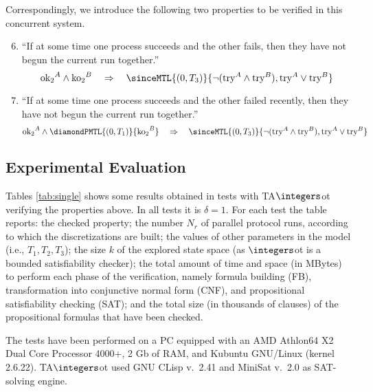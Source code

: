 \documentclass[a4paper]{article}
\newcommand{\tait}[1]{\mathrm{#1}}
\newcommand{\try}{\tait{try}}
\newcommand{\okk}{\tait{ok_2}}
\newcommand{\koo}{\tait{ko_2}}
\newcommand{\zot}{$\integers$ot}
\newcommand{\tazot}{\textsf{TA}$\integers$ot}
\theoremstyle{plain}
\theoremstyle{definition}
\begin{document}
Correspondingly, we introduce the following two properties to be verified in this concurrent system.
\begin{enumerate}
\setcounter{enumi}{5}
\item \label{pc1}
  ``If at some time one process succeeds and the other fails, then they have not begun the current run together.''
\begin{equation*}
 \okk^A \wedge \koo^B \quad\Rightarrow\quad  \sinceMTL{(0,T_3)}{\neg(\try^A \wedge \try^B),\try^A \vee \try^B}
\end{equation*}


\item \label{pc2}
  ``If at some time one process succeeds and the other failed recently, then they have not begun the current run together.''
\begin{equation*}
 \okk^A \wedge \diamondPMTL{(0,T_1)}{\koo^B} \quad\Rightarrow\quad  \sinceMTL{(0,T_3)}{\neg(\try^A \wedge \try^B),\try^A \vee \try^B}
\end{equation*}
\end{enumerate}








\subsection{Experimental Evaluation}
Tables \ref{tab:single} shows some results obtained in tests with \tazot{} verifying the properties above.
In all tests it is $\delta = 1$.
For each test the table reports: the checked property; the number $N_r$ of parallel protocol runs, according to which the discretizations are built; the values of other parameters in the model (i.e., $T_1, T_2, T_3$); the size $k$ of the explored state space (as \zot{} is a bounded satisfiability checker); the total amount of time and space (in MBytes) to perform each phase of the verification, namely formula building (\textsc{FB}), transformation into conjunctive normal form (\textsc{CNF}), and propositional satisfiability checking (\textsc{SAT}); and the total size (in thousands of clauses) of the propositional formulas that have been checked.

The tests have been performed on a PC equipped with an AMD Athlon64 X2 Dual Core Processor 4000+, 2 Gb of RAM, and Kubuntu GNU/Linux (kernel 2.6.22).
\tazot{} used GNU CLisp v.~2.41 and MiniSat v.~2.0 as SAT-solving engine.
\end{document}
